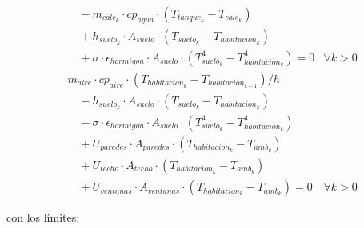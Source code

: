 \begin{align}
	                        & \quad - \dot{m}_{cale_k} \cdot cp_{agua} \cdot (T_{tanque_k} - T_{cale_k})                             \nonumber                               \\
	                        & \quad + h_{suelo_k} \cdot A_{suelo} \cdot (T_{suelo_k} - T_{habitacion_k})                             \nonumber                               \\
	                        & \quad + \sigma \cdot \epsilon_{hormigon} \cdot A_{suelo} \cdot (T_{suelo_k}^4 - T_{habitacion_k}^4) = 0  \label{eq:sys_3_sand} & \forall k > 0 \\
	                        & m_{aire} \cdot cp_{aire} \cdot ( T_{habitacion_k} - T_{habitacion_{k-1}}) / h  \nonumber                                                       \\
	                        & \quad - h_{suelo_k} \cdot A_{suelo} \cdot (T_{suelo_k} - T_{habitacion_k})  \nonumber                                                          \\
	                        & \quad - \sigma \cdot \epsilon_{hormigon} \cdot A_{suelo} \cdot (T_{suelo_k}^4 - T_{habitacion_k}^4)  \nonumber                                 \\
	                        & \quad + U_{paredes} \cdot A_{paredes} \cdot (T_{habitacion_k} - T_{amb_k}) \nonumber                                                           \\
	                        & \quad + U_{techo} \cdot A_{techo} \cdot (T_{habitacion_k} - T_{amb_k}) \nonumber                                                               \\
	                        & \quad + U_{ventanas} \cdot A_{ventanas} \cdot (T_{habitacion_k} - T_{amb_k}) = 0  \label{eq:sys_4_sand}                        & \forall k > 0
\end{align}

con los límites:

